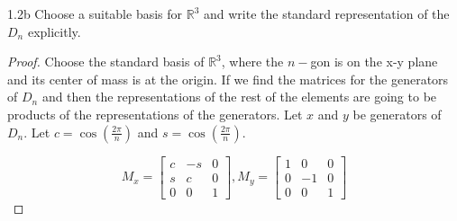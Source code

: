 \documentclass{article}
\newcommand{\R}{\mathbb{R}}
\begin{document}
\begin{PROB}{1.2b}\label{Problem 1.2b.}
    Choose a suitable basis for $\R^3$ and write the standard representation of the $D_n$ explicitly.
\end{PROB}
\begin{proof}
    Choose the standard basis of $\R^3$, where the $n-$gon is on the x-y plane and its center of mass is at the origin. If we find the matrices for the generators of $D_n$ and then the representations of the rest of the elements are going to be products of the representations of the generators. Let $x$ and $y$ be generators of $D_n$. Let $c = \cos(\frac{2\pi}{n})$ and $s = \cos(\frac{2\pi}{n})$. 
    
    \[
        M_x = \begin{bmatrix}
            c & -s & 0 \\
            s & c & 0 \\
            0 & 0 & 1
        \end{bmatrix}, M_y = \begin{bmatrix}
            1 & 0 & 0 \\
            0 & -1 & 0 \\
            0 & 0 & 1
        \end{bmatrix}
    \]
\end{proof}

\bigskip
\end{document}
